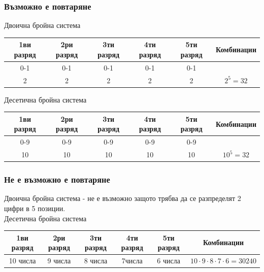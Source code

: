 \documentclass[fleqn, 12pt]{article}
\theoremstyle{definition}
\begin{document}
\subsubsection*{Възможно е повтаряне}
Двоична бройна система
\begin{center}
\begin{tabular}{|c|c|c|c|c|c|} 
\hline
1ви разряд & 2ри разряд &3ти разряд &4ти разряд &5ти разряд & Комбинации \\
\hline
0-1 & 0-1 & 0-1 & 0-1 & 0-1 & \\
\hline
2 & 2 & 2 & 2 & 2 & $2^5 = 32$ \\
\hline
\end{tabular}
\end{center}
Десетична бройна система
\begin{center}
\begin{tabular}{|c|c|c|c|c|c|} 
\hline
1ви разряд & 2ри разряд &3ти разряд &4ти разряд &5ти разряд & Комбинации \\
\hline
0-9 & 0-9 & 0-9 & 0-9 & 0-9 & \\
\hline
10 & 10 & 10 & 10 & 10 & $10^5 = 32$ \\
\hline
\end{tabular}
\end{center}

\subsubsection*{Не е възможно е повтаряне}
Двоична бройна система - не е възможно защото трябва да се разпределят 2 цифри в 5 позиции.\\
Десетична бройна система
\begin{center}
\begin{tabular}{|c|c|c|c|c|c|} 
\hline
1ви разряд & 2ри разряд &3ти разряд &4ти разряд &5ти разряд & Комбинации \\
\hline
10 числа & 9 числа & 8 числа & 7числа & 6 числа & $10 \cdot 9 \cdot 8 \cdot 7 \cdot 6 = 30240$\\
\hline
\end{tabular}
\end{center}

\newpage
\end{document}
